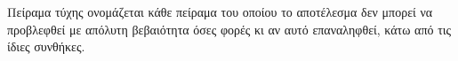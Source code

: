 Πείραμα τύχης ονομάζεται κάθε πείραμα του οποίου το αποτέλεσμα δεν μπορεί να προβλεφθεί με απόλυτη βεβαιότητα όσες φορές κι αν αυτό επαναληφθεί, κάτω από τις ίδιες συνθήκες.
